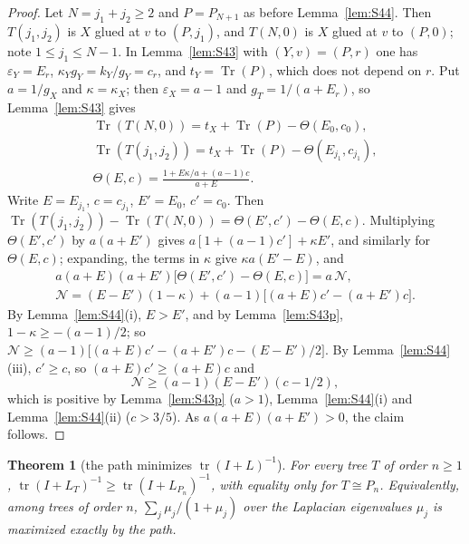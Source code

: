 \documentclass[11pt]{amsart}
\newtheorem{theorem}{Theorem}[section]
\theoremstyle{definition}
\theoremstyle{remark}
\newcommand{\tr}{\operatorname{tr}}
\newcommand{\Tr}{\operatorname{Tr}}
\begin{document}
\begin{proof}
Let $N=j_1+j_2\ge2$ and $P=P_{N+1}$ as before Lemma~\ref{lem:S44}. Then
$T(j_1,j_2)$ is $X$ glued at $v$ to $(P,j_1)$, and $T(N,0)$ is $X$ glued at
$v$ to $(P,0)$; note $1\le j_1\le N-1$. In Lemma~\ref{lem:S43} with
$(Y,v)=(P,r)$ one has $\varepsilon_Y=E_r$, $\kappa_Yg_Y=k_Y/g_Y=c_r$, and
$t_Y=\Tr(P)$, which does not depend on $r$. Put $a=1/g_X$ and
$\kappa=\kappa_X$; then $\varepsilon_X=a-1$ and $g_T=1/(a+E_r)$, so
Lemma~\ref{lem:S43} gives
\begin{gather*}
\Tr(T(N,0))=t_X+\Tr(P)-\Theta(E_0,c_0),\\
\Tr(T(j_1,j_2))=t_X+\Tr(P)-\Theta(E_{j_1},c_{j_1}),\\
\Theta(E,c)=\frac{1+E\kappa/a+(a-1)c}{a+E}.
\end{gather*}
Write $E=E_{j_1}$, $c=c_{j_1}$, $E'=E_0$, $c'=c_0$. Then
$\Tr(T(j_1,j_2))-\Tr(T(N,0))=\Theta(E',c')-\Theta(E,c)$. Multiplying
$\Theta(E',c')$ by $a(a+E')$ gives $a[1+(a-1)c']+\kappa E'$, and similarly
for $\Theta(E,c)$; expanding, the terms in $\kappa$ give $\kappa a(E'-E)$, and
\begin{gather*}
a(a+E)(a+E')\bigl[\Theta(E',c')-\Theta(E,c)\bigr]=a\,\mathcal N,\\
\mathcal N=(E-E')(1-\kappa)+(a-1)\bigl[(a+E)c'-(a+E')c\bigr].
\end{gather*}
By Lemma~\ref{lem:S44}(i), $E>E'$, and by Lemma~\ref{lem:S43p},
$1-\kappa\ge-(a-1)/2$; so
$\mathcal N\ge(a-1)\bigl[(a+E)c'-(a+E')c-(E-E')/2\bigr]$. By
Lemma~\ref{lem:S44}(iii), $c'\ge c$, so $(a+E)c'\ge(a+E)c$ and
\[
\mathcal N\ge(a-1)(E-E')(c-1/2),
\]
which is positive by Lemma~\ref{lem:S43p} ($a>1$), Lemma~\ref{lem:S44}(i)
and Lemma~\ref{lem:S44}(ii) ($c>3/5$). As $a(a+E)(a+E')>0$, the claim
follows.
\end{proof}

\begin{theorem}[the path minimizes $\tr(I+L)^{-1}$]\label{thm:T10}
For every tree $T$ of order $n\ge1$, $\tr(I+L_T)^{-1}\ge\tr(I+L_{P_n})^{-1}$,
with equality only for $T\cong P_n$. Equivalently, among trees of order $n$,
$\sum_j\mu_j/(1+\mu_j)$ over the Laplacian eigenvalues $\mu_j$ is maximized
exactly by the path.
\end{theorem}
\end{document}
